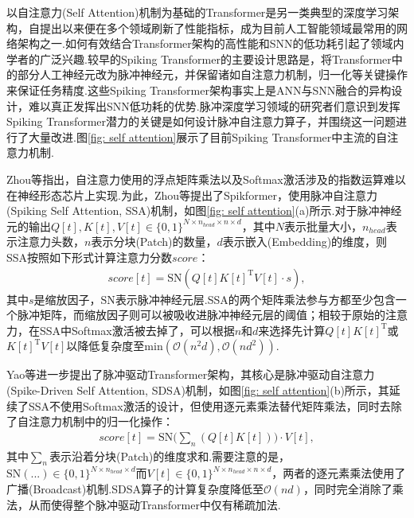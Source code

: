 \documentclass{SCIS2020cn}
\begin{document}
以自注意力(Self Attention)机制为基础的Transformer\cite{vaswani2017attention}是另一类典型的深度学习架构，自提出以来便在多个领域刷新了性能指标，成为目前人工智能领域最常用的网络架构之一.如何有效结合Transformer架构的高性能和SNN的低功耗引起了领域内学者的广泛兴趣.较早的Spiking Transformer\cite{zhang2022spiking,zhang2022spike,han2023complex}的主要设计思路是，将Transformer中的部分人工神经元改为脉冲神经元，并保留诸如自注意力机制，归一化等关键操作来保证任务精度.这些Spiking Transformer架构事实上是ANN与SNN融合的异构设计，难以真正发挥出SNN低功耗的优势.脉冲深度学习领域的研究者们意识到发挥Spiking Transformer潜力的关键是如何设计脉冲自注意力算子，并围绕这一问题进行了大量改进.图\ref{fig: self attention}展示了目前Spiking Transformer中主流的自注意力机制.

Zhou等\cite{zhou2023spikformer}指出，自注意力使用的浮点矩阵乘法以及Softmax激活涉及的指数运算难以在神经形态芯片上实现.为此，Zhou等\cite{zhou2023spikformer}提出了Spikformer，使用脉冲自注意力(Spiking Self Attention, SSA)机制，如图\ref{fig: self attention}(a)所示.对于脉冲神经元的输出$Q[t], K[t], V[t] \in \{0, 1\}^{N \times n_{head} \times n \times d}$，其中$N$表示批量大小，$n_{head}$表示注意力头数，$n$表示分块(Patch)的数量，$d$表示嵌入(Embedding)的维度，则SSA按照如下形式计算注意力分数$score$：
\begin{eqnarray}
score[t] = \text{SN}(Q[t]K[t]^{\mathrm{T}}V[t] \cdot s), 
\end{eqnarray}
其中$s$是缩放因子，$\text{SN}$表示脉冲神经元层.SSA的两个矩阵乘法参与方都至少包含一个脉冲矩阵，而缩放因子则可以被吸收进脉冲神经元层的阈值；相较于原始的注意力，在SSA中Softmax激活被去掉了，可以根据$n$和$d$来选择先计算$Q[t]K[t]^{\mathrm{T}}$或$K[t]^{\mathrm{T}}V[t]$以降低复杂度至$\text{min}(\mathcal{O}(n^{2}d), \mathcal{O}(nd^{2}))$.

Yao等\cite{NEURIPS2023_ca0f5358}进一步提出了脉冲驱动Transformer架构，其核心是脉冲驱动自注意力(Spike-Driven Self Attention, SDSA)机制，如图\ref{fig: self attention}(b)所示，其延续了SSA不使用Softmax激活的设计，但使用逐元素乘法替代矩阵乘法，同时去除了自注意力机制中的归一化操作：
\begin{eqnarray}
score[t] = \text{SN}\Big(\sum_{n}(Q[t]K[t])\Big) \cdot V[t], 
\end{eqnarray}
其中$\sum_{n}$表示沿着分块(Patch)的维度求和.需要注意的是，$\text{SN}(...) \in \{0, 1\}^{N \times n_{head} \times d}$而$V[t]\in \{0, 1\}^{N \times n_{head} \times n \times d}$，两者的逐元素乘法使用了广播(Broadcast)机制.SDSA算子的计算复杂度降低至$\mathcal{O}(nd)$，同时完全消除了乘法，从而使得整个脉冲驱动Transformer中仅有稀疏加法.
\end{document}
